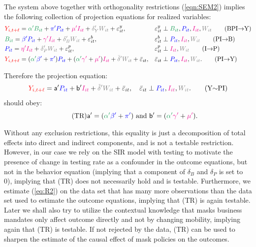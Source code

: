 \documentclass[11pt,reqno,letter]{amsart}
\theoremstyle{definition}
\renewcommand{\to}{{\rightarrow}}
\def\bcolor{\color{ForestGreen}}
\def\pcolor{\color{blue}}
\def\icolor{\color{magenta}}
\def\wcolor{\color{gray}}
\def\ycolor{\color{red}}
\begin{document}
The system above together with  orthogonality restrictions (\ref{eqn:SEM2}) implies the following collection of projection equations for realized variables:
\begin{align}
   &  {\ycolor  Y_{i,t+\ell}}
    = {\bcolor\alpha ' B_{it}} + {\pcolor\pi 'P_{it}} + {\icolor\mu'I_{it}} + {\wcolor\delta_Y 'W_{it}}  + \varepsilon^y_{it},
    &  & \varepsilon^y_{it} \perp {\bcolor B_{it}}, {\pcolor P_{it}}, {\icolor I_{it}}, {\wcolor W_{it}} \label{eq:R1} \tag{BPI$\to$Y} \\
    &  {\bcolor B_{it}}
     =  {\pcolor \beta' P_{it}} + {\icolor \gamma'I_{it}} +  {\wcolor \delta_B' W_{it}} + \varepsilon^b_{it},
   & & \varepsilon^b_{it} \perp {\pcolor P_{it}}, {\icolor I_{it}}, {\wcolor W_{it}}  \label{eq:R2} \tag{PI$\to$B}  \\
    & {\pcolor P_{it}}
    =  {\icolor\eta'I_{it}} + {\wcolor \delta_P' W_{it}} +   \varepsilon^p_{it},   & & \varepsilon^p_{it} \perp   {\icolor I_{it}}, {\wcolor W_{it}}  \label{eq:R3}  \tag{I$\to$P} \\
    &  {\ycolor  Y_{i,t+\ell}}
   =     ( {\bcolor\alpha '}  {\pcolor \beta' }+{\pcolor\pi'} )   {\pcolor P_{it}} +    ( {\bcolor\alpha '}  {\icolor \gamma'} + {\icolor \mu'}){\icolor I_{it} }+ {\wcolor \bar{\delta} '}{\wcolor W_{it}}  + {\bar \varepsilon}_{it},  &&  {\bar \varepsilon}_{it} \perp
  {\pcolor P_{it}},  {\icolor I_{it}}, {\wcolor W_{it}}.  \label{eq:R4} \tag{PI$\to$Y}
      \end{align}

Therefore the projection equation:
\begin{equation}
   {\ycolor  Y_{i,t+\ell}}
   = \mathsf{a}'
    {\pcolor P_{it}} + \mathsf{b}'    {\icolor I_{it} }+ {\wcolor \tilde {\delta} '}{\wcolor W_{it}}  + {\bar \varepsilon}_{it},  \quad   {\bar \varepsilon}_{it} \perp
  {\pcolor P_{it}},  {\icolor I_{it}}, {\wcolor W_{it}}.  \label{eq:PR} \tag{Y$\sim$PI}
\end{equation}
should obey:
\begin{equation}\label{eq:TI} \tag{TR}
 \mathsf{a}'  = ( {\bcolor\alpha '}  {\pcolor \beta' }+{\pcolor\pi'} ) \text{ and }
\mathsf{b}'  = ( {\bcolor\alpha '}  {\icolor \gamma'} + {\icolor \mu'}).
\end{equation}


Without any exclusion restrictions, this equality is just a decomposition of total effects
into direct and indirect components, and is not a testable restriction. However, in our case we rely on the SIR
model with testing to motivate the presence of change in testing rate as a confounder in the outcome
equations, but not in the behavior equation (implying that a component of $\delta_B$ and $\delta_P$ is set to 0), implying that (TR) does not necessarily hold and is testable. Furthermore, we estimate (\ref{eq:R2}) on the data set that has many more observations than the data set used to estimate the outcome equations, implying that (TR) is again testable.  Later we  shall also try to
utilize the contextual knowledge that masks business mandates only affect outcome directly and not by changing mobility, implying again that (TR) is testable. If not rejected by the data, (TR) can be used to sharpen the estimate of the causal effect of mask policies on the outcomes.
\end{document}
